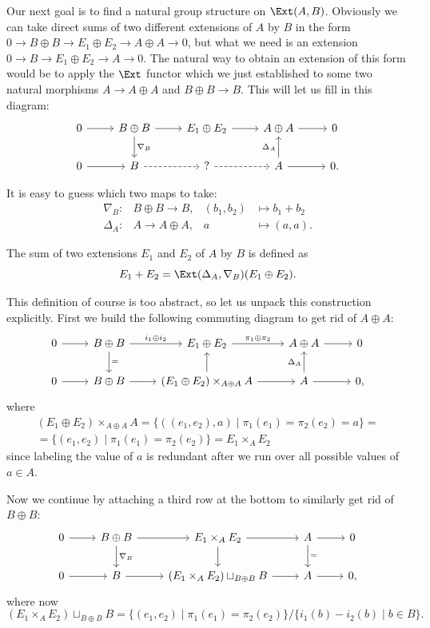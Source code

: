 Our next goal is to find a natural group structure on $\Ext(A,B)$. Obviously we can take direct sums of two different extensions of $A$ by $B$ in the form $0\to B\oplus B\to E_1\oplus E_2\to A\oplus A\to 0$, but what we need is an extension $0\to B\to E_1\oplus E_2\to A\to 0$. The natural way to obtain an extension of this form would be to apply the $\Ext$ functor which we just established to some two natural morphisms $A\to A\oplus A$ and $B\oplus B\to B$. This will let us fill in this diagram:
    \[\begin{tikzcd}
        0\arrow[r] & B\oplus B\arrow[r]\arrow[d,"\nabla_B"] & E_1\oplus E_2 \arrow[r] & A\oplus A\arrow[r] & 0 \\
        0\arrow[r] & B\arrow[r,dashed]       & ?  \arrow[r,dashed]    & A\arrow[r] \arrow[u,"\Delta_A"] & 0.
    \end{tikzcd}\]

It is easy to guess which two maps to take:
\begin{align}
    \nabla_B:&B\oplus B\to B,  &(b_1,b_2)&\mapsto b_1+b_2\\
    \Delta_A:&A\to A\oplus A,  &a&\mapsto (a,a).
\end{align}

\begin{defn}
    The sum of two extensions $E_1$ and $E_2$ of $A$ by $B$ is defined as
    \[E_1+E_2=\Ext(\Delta_A,\nabla_B)(E_1\oplus E_2).\]
\end{defn}

This definition of course is too abstract, so let us unpack this construction explicitly.
First we build the following commuting diagram to get rid of $A\oplus A$:
\[\begin{tikzcd}
    0\arrow[r] & B\oplus B\arrow[r,"i_1\oplus i_2"]\arrow[d,"="] & E_1\oplus E_2 \arrow[r,"\pi_1\oplus \pi_2"] & A\oplus A\arrow[r] & 0 \\
    0\arrow[r] & B\oplus B\arrow[r]       & (E_1\oplus E_2)\times_{A\oplus A}A  \arrow[r] \arrow[u]   & A\arrow[r] \arrow[u,"\Delta_A"] & 0,
\end{tikzcd}\]
where
\begin{multline}
    (E_1\oplus E_2)\times_{A\oplus A}A=\{((e_1,e_2),a)\mid \pi_1(e_1)=\pi_2(e_2)=a\} =\\
    =\{(e_1,e_2)\mid\pi_1(e_1)=\pi_2(e_2)\}=E_1\times_A E_2
\end{multline}
since labeling the value of $a$ is redundant after we run over all possible values of $a\in A$.

Now we continue by attaching a third row at the bottom to similarly get rid of $B\oplus B$:
\[\begin{tikzcd}
    0\arrow[r] & B\oplus B\arrow[r] \arrow[d,"\nabla_B"]   & E_1\times_A E_2\arrow[d]  \arrow[r]  & A\arrow[r]\arrow[d,"="] & 0\\
    0\arrow[r] & B \arrow[r] & (E_1\times_A E_2)\sqcup_{B\oplus B}B\arrow[r] & A\arrow[r]&0,
\end{tikzcd}\]
where now 
\[(E_1\times_A E_2)\sqcup_{B\oplus B}B=\{(e_1,e_2)\mid \pi_1(e_1)=\pi_2(e_2)\}\slash\{i_1(b)-i_2(b)\mid b\in B\}.\]


